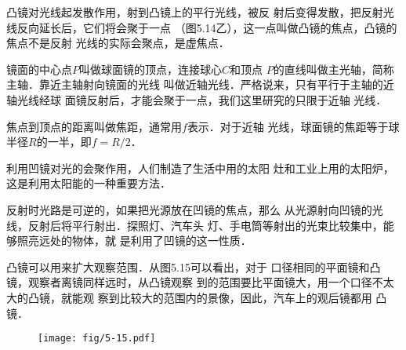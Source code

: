 凸镜对光线起发散作用，射到凸镜上的平行光线，被反
射后变得发散，把反射光线反向延长后，它们将会聚于一点
（图5.14乙），这一点叫做凸镜的焦点，凸镜的焦点不是反射
光线的实际会聚点，是虚焦点．

镜面的中心点$P$叫做球面镜的顶点，连接球心$C$和顶点
$P$的直线叫做主光轴，简称主轴．靠近主轴射向镜面的光线
叫做近轴光线．严格说来，只有平行于主轴的近轴光线经球
面镜反射后，才能会聚于一点，我们这里研究的只限于近轴
光线．

焦点到顶点的距离叫做焦距，通常用$f$表示．对于近轴
光线，球面镜的焦距等于球半径$R$的一半，即$f=R/2$．

利用凹镜对光的会聚作用，人们制造了生活中用的太阳
灶和工业上用的太阳炉，这是利用太阳能的一种重要方法．

反射时光路是可逆的，如果把光源放在凹镜的焦点，那么
从光源射向凹镜的光线，反射后将平行射出．探照灯、汽车头
灯、手电筒等射出的光束比较集中，能够照亮远处的物体，就
是利用了凹镜的这一性质．

凸镜可以用来扩大观察范围．从图5.15可以看出，对于
口径相同的平面镜和凸镜，观察者离镜同样远时，从凸镜观察
到的范围要比平面镜大，用一个口径不太大的凸镜，就能观
察到比较大的范围内的景像，因此，汽车上的观后镜都用
凸镜．

\begin{figure}[htp]\centering
    \texttt{[image: fig/5-15.pdf]}
    \caption{}
    \end{figure}

